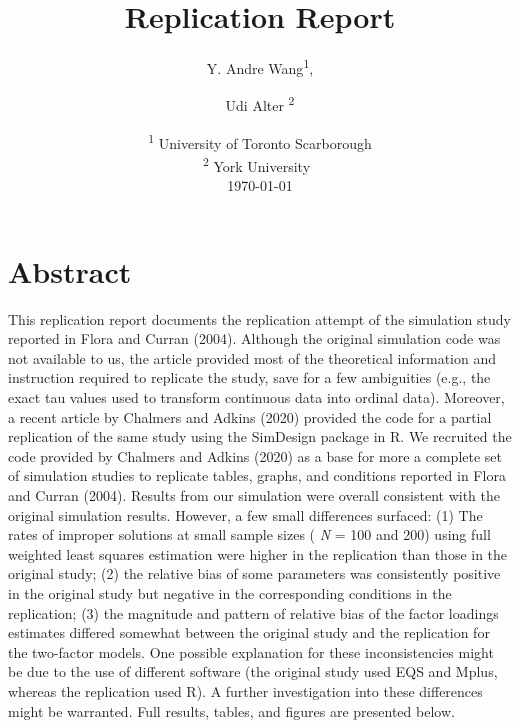 \documentclass[10,a4paperpaper,]{article}
\title{Replication Report}
\author{Y. Andre Wang\textsuperscript{1}, \and Udi Alter
\textsuperscript{2}}
\date{%
		\textsuperscript{1} University of Toronto Scarborough\\%
		\textsuperscript{2} York University~\\[2ex]
		\today
   }
\begin{document}
\captionsetup[table]{labelformat=empty}


\maketitle

\section*{Abstract}

This replication report documents the replication attempt of the
simulation study reported in Flora and Curran (2004). Although the
original simulation code was not available to us, the article provided
most of the theoretical information and instruction required to
replicate the study, save for a few ambiguities (e.g., the exact tau
values used to transform continuous data into ordinal data). Moreover, a
recent article by Chalmers and Adkins (2020) provided the code for a
partial replication of the same study using the SimDesign package in R.
We recruited the code provided by Chalmers and Adkins (2020) as a base
for more a complete set of simulation studies to replicate tables,
graphs, and conditions reported in Flora and Curran (2004). Results from
our simulation were overall consistent with the original simulation
results. However, a few small differences surfaced: (1) The rates of
improper solutions at small sample sizes ( \emph{N} = 100 and 200) using
full weighted least squares estimation were higher in the replication
than those in the original study; (2) the relative bias of some
parameters was consistently positive in the original study but negative
in the corresponding conditions in the replication; (3) the magnitude
and pattern of relative bias of the factor loadings estimates differed
somewhat between the original study and the replication for the
two-factor models. One possible explanation for these inconsistencies
might be due to the use of different software (the original study used
EQS and Mplus, whereas the replication used R). A further investigation
into these differences might be warranted. Full results, tables, and
figures are presented below.

~

\noindent{}

\par

\noindent{}
\end{document}
